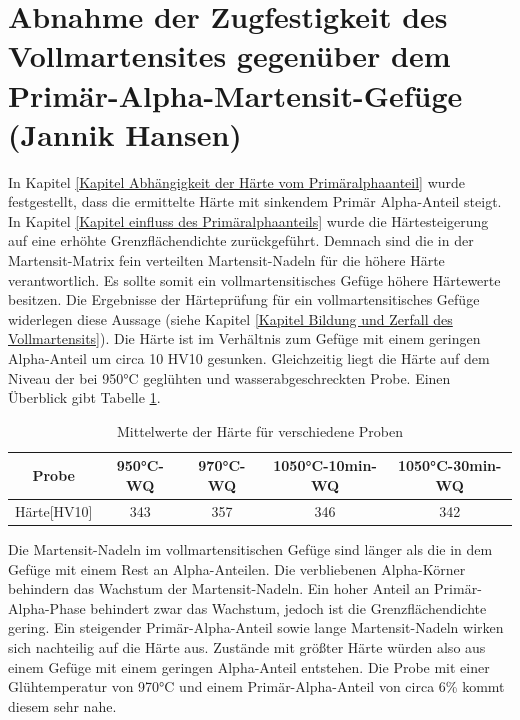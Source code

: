 \documentclass[a4paper, 11pt]{tubsreprt}
\begin{document}
\section{Abnahme der Zugfestigkeit des Vollmartensites gegenüber dem Primär-Alpha-Martensit-Gefüge (Jannik Hansen)}
In Kapitel \ref{Kapitel Abhängigkeit der Härte vom Primäralphaanteil} wurde festgestellt, dass die ermittelte Härte mit sinkendem Primär Alpha-Anteil steigt. In Kapitel \ref{Kapitel einfluss des Primäralphaanteils} wurde die Härtesteigerung auf eine erhöhte Grenzflächendichte zurückgeführt. Demnach sind die in der Martensit-Matrix fein verteilten Martensit-Nadeln für die höhere Härte verantwortlich.
Es sollte somit ein vollmartensitisches Gefüge höhere Härtewerte besitzen.
Die Ergebnisse der Härteprüfung für ein vollmartensitisches Gefüge  widerlegen diese Aussage (siehe Kapitel \ref{Kapitel Bildung und Zerfall des Vollmartensits}). Die Härte ist im Verhältnis zum Gefüge mit einem geringen Alpha-Anteil um circa 10 HV10 gesunken. Gleichzeitig liegt die Härte auf dem Niveau der bei 950°C geglühten und wasserabgeschreckten Probe. Einen Überblick gibt Tabelle \ref{Tabelle Mittelwerte Härte für verschiedene Proben}.
\begin{table}
\begin{tabular}{c|c|c|c|c}
Probe & 950°C-WQ & 970°C-WQ & 1050°C-10min-WQ & 1050°C-30min-WQ \\
\hline
Härte[HV10] & 343 & 357 & 346 & 342 \\
\end{tabular}
\caption{Mittelwerte der Härte für verschiedene Proben}
\label{Tabelle Mittelwerte Härte für verschiedene Proben}
\end{table}

Die Martensit-Nadeln im vollmartensitischen Gefüge sind länger als die in dem Gefüge mit einem Rest an Alpha-Anteilen. Die verbliebenen Alpha-Körner behindern das Wachstum der Martensit-Nadeln. Ein hoher Anteil an Primär-Alpha-Phase behindert zwar das Wachstum, jedoch ist die Grenzflächendichte gering. Ein steigender Primär-Alpha-Anteil sowie lange Martensit-Nadeln wirken sich nachteilig auf die Härte aus. Zustände mit größter Härte würden also aus einem Gefüge mit einem geringen Alpha-Anteil entstehen. Die Probe mit einer Glühtemperatur von 970°C und einem Primär-Alpha-Anteil von circa 6\% kommt diesem sehr nahe.
\end{document}
